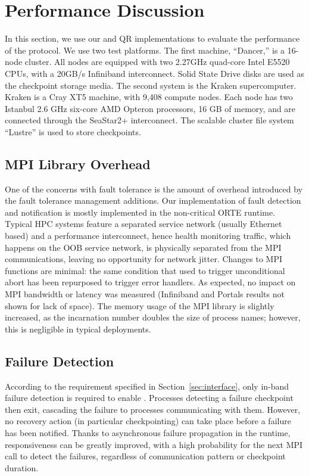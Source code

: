 \section{Performance Discussion}\label{sec:experiments}

In this section, we use our \ompi and \abft QR implementations to
evaluate the performance of the \cof protocol. We
use two test platforms. The first machine, ``Dancer,'' is a 16-node
cluster. All nodes are equipped with two 2.27GHz quad-core Intel E5520
CPUs, with a 20GB/s Infiniband interconnect. Solid State Drive disks are
used as the checkpoint storage media. The second system is the Kraken
supercomputer. Kraken is a Cray XT5 machine, with 9,408 compute nodes.
Each node has two Istanbul 2.6 GHz six-core AMD Opteron processors, 16
GB of memory, and are connected through the SeaStar2+ interconnect. The
scalable cluster file system ``Lustre'' is used to store checkpoints.

\subsection{MPI Library Overhead}

One of the concerns with fault tolerance is the amount of overhead
introduced by the fault tolerance management additions. Our
implementation of fault detection and notification is mostly implemented
in the non-critical ORTE runtime. Typical HPC systems
feature a separated service network (usually Ethernet based) and a
performance interconnect, hence health monitoring traffic, which happens
on the OOB service network, is physically separated from the MPI
communications, leaving no opportunity for network jitter. Changes to
MPI functions are minimal: the same condition that used to trigger
unconditional abort has been repurposed to trigger error handlers. As
expected, no impact on MPI bandwidth or latency was measured
(Infiniband and Portals results not shown for lack of space). The memory
usage of the MPI library is slightly increased, as the incarnation
number doubles the size of process names; however, this is negligible in
typical deployments.

\subsection{Failure Detection}

According to the requirement specified in Section~\ref{sec:interface}, only
in-band failure detection is required to enable \cof. Processes detecting a
failure checkpoint then exit, cascading the failure to processes communicating
with them. However, no recovery action (in particular checkpointing) can take 
place before a failure has been
notified. Thanks to asynchronous failure propagation in the
runtime, responsiveness can be greatly improved, with a high probability for the
next MPI call to detect the failures, regardless of communication pattern or
checkpoint duration.

